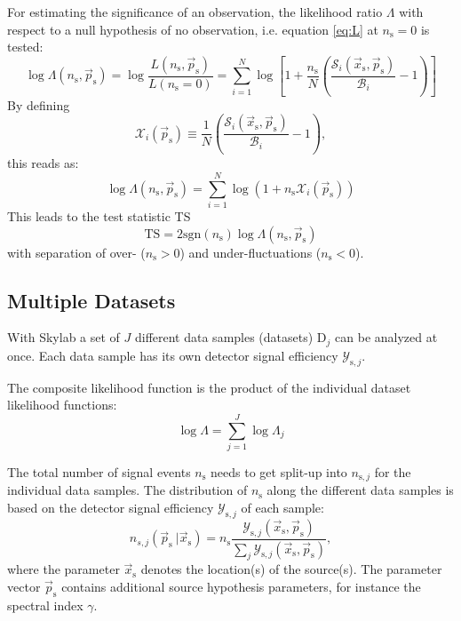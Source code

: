 \documentclass{article}
\newcommand{\ns}{n_{\mathrm{s}}}
\newcommand{\ps}{\vec{p}_{\mathrm{s}}}
\newcommand{\xs}{\vec{x}_{\mathrm{s}}}
\begin{document}
For estimating the significance of an observation, the likelihood ratio
$\Lambda$ with respect to a null hypothesis of no observation, i.e.
equation \ref{eq:L} at $\ns=0$ is tested:
\begin{equation}
 \log \Lambda(\ns,\ps) = \log \frac{L(\ns,\ps)}{L(\ns=0)} = \sum_{i=1}^{N} \log \left[ 1 + \frac{\ns}{N}\left( \frac{\mathcal{S}_i(\xs,\ps)}{\mathcal{B}_i} - 1 \right) \right]
\end{equation}
By defining
\begin{equation}
\mathcal{X}_i(\ps) \equiv \frac{1}{N}\left( \frac{\mathcal{S}_i(\xs,\ps)}{\mathcal{B}_i} - 1 \right),
\label{eq:Xi}
\end{equation}
this reads as:
\begin{equation}
 \log \Lambda(\ns,\ps) = \sum_{i=1}^{N} \log (1 + \ns\mathcal{X}_i(\ps))
 \label{eq:logLambda}
\end{equation}
This leads to the test statistic TS
\begin{equation}
 \mathrm{TS} = 2\mathrm{sgn}(\ns) \log \Lambda(\ns,\ps)
 \label{eq:TS}
\end{equation}
with separation of over- ($\ns > 0$) and under-fluctuations ($\ns < 0$).

\subsection{Multiple Datasets}

With Skylab a set of $J$ different data samples (datasets) $\mathrm{D}_j$ can be
analyzed at once. Each data sample has its own detector signal efficiency
$\mathcal{Y}_{\mathrm{s},j}$.

The composite likelihood function is the product of the individual dataset
likelihood functions:
\begin{equation}
 \log \Lambda = \sum_{j=1}^{J} \log \Lambda_j
 \label{eq:logLambdaComposite}
\end{equation}

The total number of signal events $\ns$ needs to get split-up into
$n_{\mathrm{s},j}$ for the individual data samples. The distribution of $\ns$
along the different data samples is based on the detector signal efficiency
$\mathcal{Y}_{\mathrm{s},j}$ of each sample:
\begin{equation}
 n_{s,j}(\ps~|\vec{x}_{\mathrm{s}}) = \ns \frac{\mathcal{Y}_{\mathrm{s},j}(\vec{x}_{\mathrm{s}},\ps)}{\sum_j \mathcal{Y}_{\mathrm{s},j}(\vec{x}_{\mathrm{s}},\ps)},
 \label{eq:nsjy}
\end{equation}
where the parameter $\vec{x}_{\mathrm{s}}$ denotes the location(s) of the source(s).
The parameter vector $\ps$ contains additional source hypothesis parameters,
for instance the spectral index $\gamma$.
\end{document}
